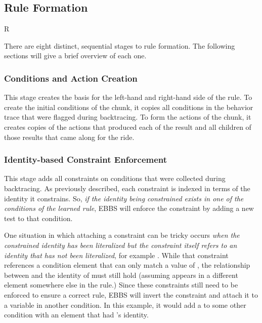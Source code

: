 \subsection{Rule Formation}
\label{CHUNKING-during-formation}

\begin{wrapfigure}{R}{\thirdwidth}
	\caption[The eight stages of rule formation]{}
	\label{fig:chunking-rule-formation}
	\vspace{-40pt}
\end{wrapfigure}

There are eight distinct, sequential stages to rule formation.  The following sections will give a brief overview of each one.

\subsubsection{Conditions and Action Creation}

This stage creates the basis for the left-hand and right-hand side of the rule.
To create the initial conditions of the chunk, it copies all conditions in the behavior trace that were flagged during backtracing. To form the actions of the chunk, it creates copies of the actions that produced each of the result and all children of those results that came along for the ride.

\subsubsection{Identity-based Constraint Enforcement}

This stage adds all constraints on conditions that were collected during backtracing.  As previously described, each constraint is indexed in terms of the identity it constrains.  So, \textit{if the identity being constrained exists in one of the conditions of the learned rule}, EBBS will enforce the constraint by adding a new test to that condition.

One situation in which attaching a constraint can be tricky occurs \textit{when the constrained identity has been literalized but the constraint itself refers to an identity that has not been literalized}, for example .  While that constraint references a condition element that can only match a value of , the relationship between  and the identity of  must still hold (assuming  appears in a different element somewhere else in the rule.)  Since these constraints still need to be enforced to ensure a correct rule, EBBS will invert the constraint and attach it to a variable in another condition.  In this example, it would add a  to some other condition with an element that had 's identity.

